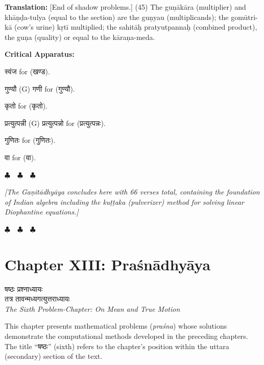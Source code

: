 \documentclass[11pt,a4paper]{article}
\newcommand{\dev}[1]{{\devanagarifont #1}}
\newenvironment{variants}{%
  \small%
  \color{varecolor}%
  \list{}{\leftmargin=2em\itemindent=-1em}%
}{\endlist}
\newcommand{\chapterend}{%
  \begin{center}%
  \textcolor{endmarkcolor}{$\clubsuit$~~$\clubsuit$~~$\clubsuit$}%
  \end{center}%
}
\begin{document}
\textbf{Translation:} [End of shadow problems.] (45) The guṇākāra (multiplier) and 
khāṇḍa-tulya (equal to the section) are the guṇyau (multiplicands); the gomūtri-kā 
(cow's urine) kṛtī multiplied; the sahitāḥ pratyutpannaḥ (combined product), the 
guṇa (quality) or equal to the kāraṇa-meda.

\textcolor{varecolor}{\textbf{Critical Apparatus:}}
\begin{variants}
\item[45.1] \dev{स्वंज} \dev{for} (\dev{खण्ड}).
\item[45.2] \dev{गुण्यौ} (G) \dev{गणी} \dev{for} (\dev{गुण्यौ}).
\item[45.3] \dev{कृतो} \dev{for} (\dev{कृतो}).
\item[45.4] \dev{प्रत्युत्पन्नी} (G) \dev{प्रत्युत्पन्नो} \dev{for} (\dev{प्रत्युत्पन्नः}).
\item[45.5] \dev{गुणितः} \dev{for} (\dev{गुणितः}).
\item[45.6] \dev{वा} \dev{for} (\dev{वा}).
\end{variants}

\vspace{0.5cm}
\chapterend
\textit{[The Gaṇitādhyāya concludes here with 66 verses total, containing the 
foundation of Indian algebra including the \textit{kuṭṭaka} (pulverizer) method for 
solving linear Diophantine equations.]}
\chapterend

\newpage


\section*{Chapter XIII: Praśnādhyāya}

\begin{center}
\dev{षष्ठः प्रश्नाध्यायः}\\[0.2cm]
\dev{तत्र तावन्मध्यगत्युत्तराध्यायः}\\[0.3cm]
\textit{The Sixth Problem-Chapter: On Mean and True Motion}
\end{center}

This chapter presents mathematical problems (\textit{praśna}) whose solutions 
demonstrate the computational methods developed in the preceding chapters. The 
title ``\dev{षष्ठः}'' (sixth) refers to the chapter's position within the uttara 
(secondary) section of the text.
\end{document}
